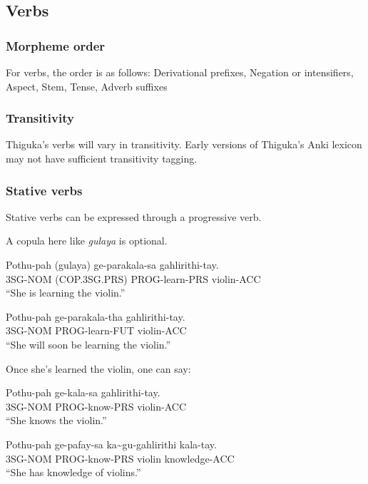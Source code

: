 \newpage{}

\subsection{Verbs}
\subsubsection{Morpheme order}
For verbs, the order is as follows: Derivational prefixes, Negation or intensifiers, Aspect, Stem, Tense, Adverb suffixes

\subsubsection{Transitivity}
Thiguka's verbs will vary in transitivity. Early versions of Thiguka's Anki lexicon may not have sufficient transitivity tagging.

\subsubsection{Stative verbs}
Stative verbs can be expressed through a progressive verb.

A copula here like \textit{gulaya} is optional.

\begin{exe}
    \ex{} \gll{}Pothu-pah (gulaya)      ge-parakala-sa gahlirithi-tay.\\
                3SG-NOM   (COP.3SG.PRS) PROG-learn-PRS violin-ACC\\
        \glt{}``She is learning the violin.''
\end{exe}

\begin{exe}
    \ex{} \gll{}Pothu-pah ge-parakala-tha gahlirithi-tay.\\
                3SG-NOM   PROG-learn-FUT violin-ACC\\
        \glt{}``She will soon be learning the violin.''
\end{exe}

Once she's learned the violin, one can say:

\begin{exe}
    \ex{} \gll{}Pothu-pah ge-kala-sa    gahlirithi-tay.\\
                3SG-NOM   PROG-know-PRS violin-ACC\\
        \glt{}``She knows the violin.''
\end{exe}

\begin{exe}
    \ex{} \gll{}Pothu-pah ge-pafay-sa    ka\~{}gu-gahlirithi kala-tay.\\
                3SG-NOM   PROG-know-PRS \agradj{}violin knowledge-ACC\\
        \glt{}``She has knowledge of violins.''
\end{exe}


